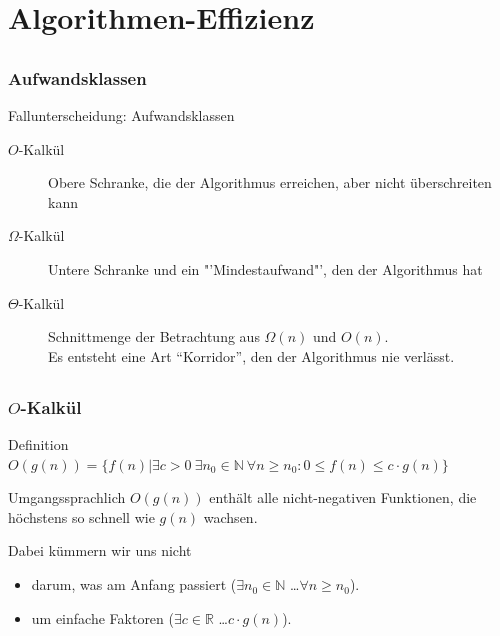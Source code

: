 
\section[Effizienz]{Algorithmen-Effizienz}
\subsection*{}
\begin{frame}
			\frametitle{Aufwandsklassen}
			\begin{block}{Fallunterscheidung: Aufwandsklassen}
                \begin{description}
                    \item[$O$-Kalkül] Obere Schranke, die der Algorithmus erreichen, aber nicht überschreiten kann
                    \item[$\Omega$-Kalkül] Untere Schranke und ein "'Mindestaufwand"', den der Algorithmus hat
					\item[$\Theta$-Kalkül] Schnittmenge der Betrachtung aus $\Omega(n)$ und
					$O(n)$.\\ Es entsteht eine Art "`Korridor"', den der Algorithmus nie
					verlässt.
                \end{description}
			\end{block}
\end{frame}

\subsection*{}
\begin{frame}
  \frametitle{$O$-Kalkül}
    \begin{block}{Definition}
          $O(g(n))=\{f(n)| \exists c > 0 \ \exists n_{0} \in \mathbb{N}\ \forall n \ge n_{0}: 0 \le f(n) \le c\cdot g(n)\}$
    \end{block}

    \begin{block}{Umgangssprachlich}
        $O(g(n))$ enthält alle nicht-negativen Funktionen, die höchstens so schnell wie $g(n)$ wachsen.

        Dabei kümmern wir uns nicht

  \begin{itemize}
    \item darum, was am Anfang passiert ($\exists n_0\in\mathbb{N}$ \ldots $\forall n\ge n_0$).
    \item um einfache Faktoren ($\exists c\in\mathbb{R}$ \ldots $c\cdot g(n)$).
  \end{itemize}
  \end{block}
\end{frame}

